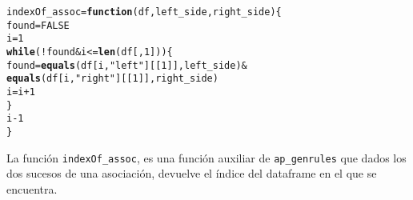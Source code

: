 \documentclass[12pt]{report}\usepackage[]{graphicx}\usepackage[dvipsnames]{xcolor}
\makeatletter
\newcommand{\hlnum}[1]{\textcolor[rgb]{0.686,0.059,0.569}{#1}}%
\newcommand{\hlstr}[1]{\textcolor[rgb]{0.192,0.494,0.8}{#1}}%
\newcommand{\hlopt}[1]{\textcolor[rgb]{0,0,0}{#1}}%
\newcommand{\hlstd}[1]{\textcolor[rgb]{0.345,0.345,0.345}{#1}}%
\newcommand{\hlkwa}[1]{\textcolor[rgb]{0.161,0.373,0.58}{\textbf{#1}}}%
\newcommand{\hlkwb}[1]{\textcolor[rgb]{0.69,0.353,0.396}{#1}}%
\newcommand{\hlkwc}[1]{\textcolor[rgb]{0.333,0.667,0.333}{#1}}%
\newcommand{\hlkwd}[1]{\textcolor[rgb]{0.737,0.353,0.396}{\textbf{#1}}}%
\newenvironment{kframe}{%
 \def\at@end@of@kframe{}%
 \ifinner\ifhmode%
  \def\at@end@of@kframe{\end{minipage}}%
  \begin{minipage}{\columnwidth}%
 \fi\fi%
 \def\FrameCommand##1{\hskip\@totalleftmargin \hskip-\fboxsep
 \colorbox{shadecolor}{##1}\hskip-\fboxsep
     \hskip-\linewidth \hskip-\@totalleftmargin \hskip\columnwidth}%
 \MakeFramed {\advance\hsize-\width
   \@totalleftmargin\z@ \linewidth\hsize
   \@setminipage}}%
 {\par\unskip\endMakeFramed%
 \at@end@of@kframe}
\newenvironment{knitrout}{}{} %
\makeatother
\begin{document}
\begin{knitrout}
\color{fgcolor}\begin{kframe}
\begin{alltt}
\hlstd{indexOf_assoc} \hlkwb{=} \hlkwa{function}\hlstd{(}\hlkwc{df}\hlstd{,} \hlkwc{left_side}\hlstd{,} \hlkwc{right_side}\hlstd{) \{}
        \hlstd{found} \hlkwb{=} \hlnum{FALSE}
        \hlstd{i} \hlkwb{=} \hlnum{1}
        \hlkwa{while}\hlstd{(}\hlopt{!}\hlstd{found} \hlopt{&} \hlstd{i} \hlopt{<=} \hlkwd{len}\hlstd{(df[,}\hlnum{1}\hlstd{])) \{}
                \hlstd{found} \hlkwb{=} \hlkwd{equals}\hlstd{(df[i,} \hlstr{"left"}\hlstd{][[}\hlnum{1}\hlstd{]], left_side)} \hlopt{&}
                        \hlkwd{equals}\hlstd{(df[i,} \hlstr{"right"}\hlstd{][[}\hlnum{1}\hlstd{]], right_side)}
                \hlstd{i} \hlkwb{=} \hlstd{i} \hlopt{+} \hlnum{1}
        \hlstd{\}}
        \hlstd{i}\hlopt{-}\hlnum{1}
\hlstd{\}}
\end{alltt}
\end{kframe}
\end{knitrout}
			
			La función \texttt{indexOf\_assoc}, es una función auxiliar de \texttt{ap\_genrules} que dados los dos sucesos de una asociación, devuelve el índice del dataframe en el que se encuentra. 
			
\end{document}
